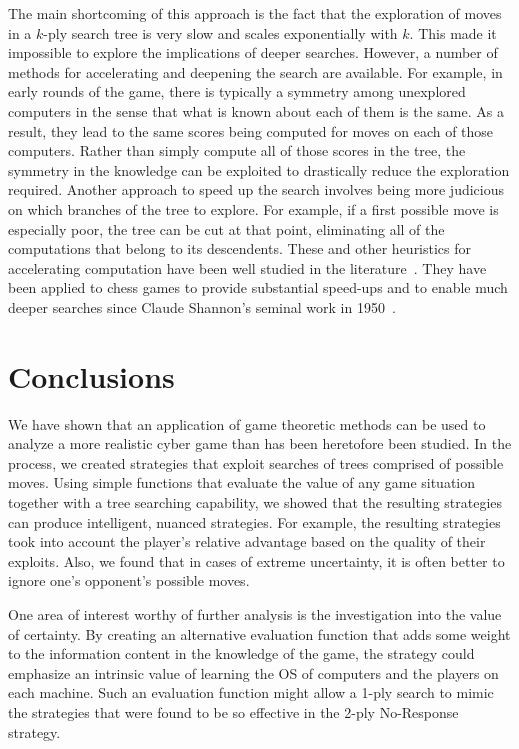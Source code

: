 \documentclass{sig-alternate}
\begin{document}
The main shortcoming of this approach is the fact that the
exploration of moves in a $k$-ply search tree is very slow and scales
exponentially with $k$. This made it impossible to explore the
implications of deeper searches. However, a number of methods
for accelerating and deepening the search are available. For example,
in early rounds of the game, there is typically a symmetry among unexplored
computers in the sense that what is known about each of them is the
same. As a result, they lead to the same scores being computed for
moves on each of those computers. 
Rather
than simply compute all of those scores in the tree, the symmetry in
the knowledge can be exploited to drastically reduce the exploration
required. Another approach to speed up the search involves being
more judicious on which branches of the tree to explore. For example,
if a first possible move is especially poor, the tree can be cut at
that point, eliminating all of the computations that belong to its
descendents. These and other heuristics for accelerating computation
have been well studied in the literature~\cite{levy2009computer}. They
have been applied to chess games to provide substantial speed-ups and
to enable much deeper searches since Claude Shannon's seminal work in
1950~\cite{shannon1950programming}.





\section{Conclusions}
\label{sec:conc}

We have shown that an application of game theoretic methods can be used
to analyze a more realistic cyber game than has been heretofore been
studied. In the process, we created strategies that exploit searches
of trees comprised of possible moves. Using simple functions that
evaluate the value of any game situation together with a tree
searching capability, we showed that the resulting strategies can
produce intelligent, nuanced strategies. For example, the resulting
strategies took into account the player's relative advantage based on
the quality of their exploits.  Also, we found that in cases of
extreme uncertainty, it is often better to ignore one's opponent's
possible moves.

One area of interest worthy of further analysis is the investigation
into the value of certainty. 
By creating an alternative
evaluation function that adds some weight to the information content in
the knowledge of the game, the strategy could emphasize an intrinsic
value of learning the OS of computers and the players on each
machine. Such an evaluation function might allow a 1-ply search to
mimic the strategies that were found to be so effective in the 2-ply
No-Response strategy.
\end{document}
